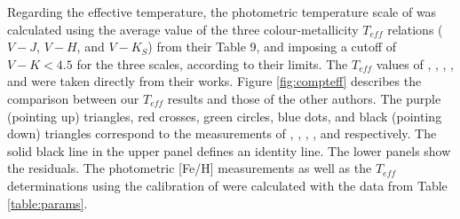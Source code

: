 \documentclass{aa}
\begin{document}
Regarding the effective temperature, the photometric temperature scale of \citet{Boyajian-2012} was calculated using the average value of the three colour-metallicity $T_{eff}$ relations ($V-J$, $V-H$, and $V-K_{S}$) from their Table 9, and imposing a cutoff of $V-K < 4.5$ for the three scales, according to their limits.  %
The $T_{eff}$ values of \citet{Woolf-2005}, \citet{Rojas-Ayala-2012}, \citet{Onehag-2012}, \citet{Mann-2013a}, and \citet{Rajpurohit-2013a} were taken directly from their works. Figure \ref{fig:compteff} describes the comparison between our $T_{eff}$ results and those of the other authors. The purple (pointing up) triangles, red crosses, green circles, blue dots, and black (pointing down) triangles correspond to the measurements of \citet{Woolf-2005}, \citet{Rojas-Ayala-2012}, \citet{Onehag-2012}, \citet{Mann-2013a}, and \citet{Rajpurohit-2013a} respectively. The solid black line in the upper panel defines an identity line. The lower panels show the residuals. %
The photometric [Fe/H] measurements as well as the $T_{eff}$ determinations using the calibration of \citet{Boyajian-2012} were calculated with the data from Table \ref{table:params}.
\end{document}
